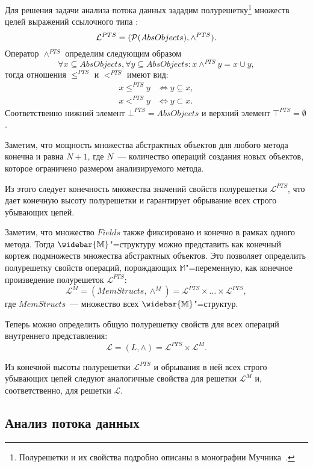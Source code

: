 \documentclass[14pt,titlepage,draft]{extarticle}
\newcommand{\M}{\ensuremath{\mathbb{M}}}
\newcommand{\Ms}{\ensuremath{\mathbb{\widebar{M}}}}
\newcommand{\Lattice}{\mathcal{L}}
\newcommand{\meet}{\wedge}
\begin{document}
    Для решения задачи анализа потока данных зададим полурешетку\footnote{
      Полурешетки и их свойства подробно описаны в монографии
      Мучника~\cite{muchnick}.
    }
    множеств целей выражений ссылочного типа :
    \[ \Lattice^{PTS} = (\powerset{AbsObjects}, \meet^{PTS}).\]
    Оператор $\meet^{PTS}$ определим следующим образом
    \[
      \forall x \subseteq AbsObjects, \forall y \subseteq AbsObjects
      \colon
      x \meet^{PTS} y = x \cup y,
    \]
    тогда отношения $\leq^{PTS}$ и $<^{PTS}$ имеют вид:
    \begin{align*}
      x \leq^{PTS} y &\Leftrightarrow y \subseteq x, \\
      x <^{PTS} y &\Leftrightarrow y \subset x.
    \end{align*}
    Соответственно нижний элемент $\bot^{PTS} = AbsObjects$
    и верхний элемент $\top^{PTS} = \emptyset$.

    Заметим, что мощность множества абстрактных объектов для любого
    метода конечна и равна $N + 1$,
    где $N$~--- количество операций создания новых объектов, которое ограничено
    размером анализируемого метода.

    Из этого следует конечность множества значений свойств полурешетки
    $\Lattice^{PTS}$, что дает конечную высоту полурешетки и гарантирует
    обрывание всех строго убывающих цепей.

    Заметим, что множество $Fields$ также фиксировано и конечно в
    рамках одного метода.
    Тогда \Ms"=структуру можно представить как конечный кортеж подмножеств
    множества абстрактных объектов.
    Это позволяет определить полурешетку свойств операций, порождающих
    \M"=переменную, как конечное произведение полурешеток $\Lattice^{PTS}$:
    \[\Lattice^M = (MemStructs, \meet^M) =
      \Lattice^{PTS} \times \ldots \times \Lattice^{PTS},\]
    где $MemStructs$~--- множество всех \Ms"=структур.

    Теперь можно определить общую полурешетку свойств для всех операций
    внутреннего представления:
    \[ \Lattice = (L, \meet) = \Lattice^{PTS} \times \Lattice^M. \]

    Из конечной высоты полурешетки $\Lattice^{PTS}$
    и обрывания в ней всех строго убывающих цепей следуют аналогичные свойства
    для решетки $\Lattice^M$ и, соответственно, для решетки $\Lattice$.

  \subsection{Анализ потока данных}
\end{document}
